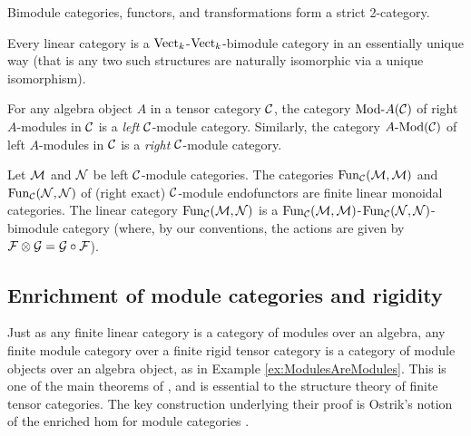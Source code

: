 \documentclass{amsart}
\begin{document}
%
Bimodule categories, functors, and transformations form a strict 2-category.  %

\begin{example}
	Every linear category is a $\mathrm{Vect}_k$-$\mathrm{Vect}_k$-bimodule category in an essentially unique way (that is any two such structures are naturally isomorphic via a unique isomorphism). %
\end{example}

\begin{example} \label{ex:ModulesAreModules}
	For any algebra object $A$ in a tensor category $\mathcal C$, the category $\Mod{}{A}(\cC)$ of right $A$-modules in $\mathcal C$ is a \emph{left} $\mathcal C$-module category.  Similarly, the category $\Mod{A}{}(\cC)$ of left $A$-modules in $\mathcal C$ is a \emph{right} $\mathcal C$-module category.
\end{example}

\begin{example}
	Let $\mathcal M$ and $\mathcal N$ be left $\mathcal C$-module categories. The categories $\operatorname{Fun}_{\mathcal C}(\mathcal M, \mathcal M)$ and $\operatorname{Fun}_{\mathcal C}(\mathcal N, \mathcal N)$ of (right exact) $\mathcal C$-module endofunctors are finite linear monoidal categories. The linear category $\operatorname{Fun}_{\mathcal C}(\mathcal M, \mathcal N)$ is a $\operatorname{Fun}_{\mathcal C}(\mathcal M, \mathcal M)$-$\operatorname{Fun}_{\mathcal C}(\mathcal N, \mathcal N)$-bimodule category (where, by our conventions, the actions are given by $\mathcal F \otimes \mathcal G = \mathcal G \circ \mathcal F$). 
\end{example}

\subsection{Enrichment of module categories and rigidity} \label{sec:tc-enrichment}
Just as any finite linear category is a category of modules over an algebra, any finite module category over a finite rigid tensor category is a category of module objects over an algebra object, as in Example \ref{ex:ModulesAreModules}.  This is one of the main theorems of \cite{EGNO}, and is essential to the structure theory of finite tensor categories.  The key construction underlying their proof is Ostrik's notion of the enriched hom for module categories \cite{MR1976459}.  
\end{document}
